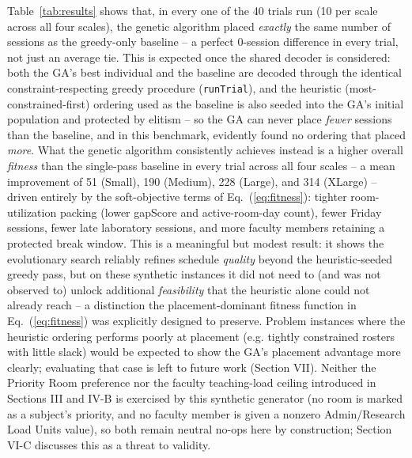 \documentclass[conference]{IEEEtran}
\begin{document}
Table~\ref{tab:results} shows that, in every one of the 40 trials run (10 per scale across all four scales), the genetic algorithm placed \emph{exactly} the same number of sessions as the greedy-only baseline -- a perfect 0-session difference in every trial, not just an average tie. This is expected once the shared decoder is considered: both the GA's best individual and the baseline are decoded through the identical constraint-respecting greedy procedure (\texttt{runTrial}), and the heuristic (most-constrained-first) ordering used as the baseline is also seeded into the GA's initial population and protected by elitism -- so the GA can never place \emph{fewer} sessions than the baseline, and in this benchmark, evidently found no ordering that placed \emph{more}. What the genetic algorithm consistently achieves instead is a higher overall \emph{fitness} than the single-pass baseline in every trial across all four scales -- a mean improvement of 51 (Small), 190 (Medium), 228 (Large), and 314 (XLarge) -- driven entirely by the soft-objective terms of Eq.~(\ref{eq:fitness}): tighter room-utilization packing (lower gapScore and active-room-day count), fewer Friday sessions, fewer late laboratory sessions, and more faculty members retaining a protected break window. This is a meaningful but modest result: it shows the evolutionary search reliably refines schedule \emph{quality} beyond the heuristic-seeded greedy pass, but on these synthetic instances it did not need to (and was not observed to) unlock additional \emph{feasibility} that the heuristic alone could not already reach -- a distinction the placement-dominant fitness function in Eq.~(\ref{eq:fitness}) was explicitly designed to preserve. Problem instances where the heuristic ordering performs poorly at placement (e.g. tightly constrained rosters with little slack) would be expected to show the GA's placement advantage more clearly; evaluating that case is left to future work (Section VII). Neither the Priority Room preference nor the faculty teaching-load ceiling introduced in Sections III and IV-B is exercised by this synthetic generator (no room is marked as a subject's priority, and no faculty member is given a nonzero Admin/Research Load Units value), so both remain neutral no-ops here by construction; Section VI-C discusses this as a threat to validity.
\end{document}
